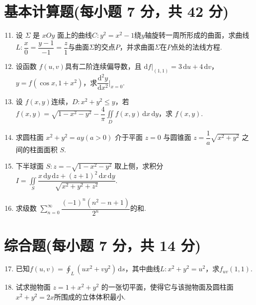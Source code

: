 \documentclass[../Main.tex]{subfiles}
\begin{document}
\section{基本计算题(每小题 7 分，共 42 分)}
\begin{enumerate}
  \setcounter{enumi}{10}
  \item 设 \( \Sigma \) 是 \( xOy \) 面上的曲线$C:y^2=x^2-1$绕$y$轴旋转一周所形成的曲面，求曲线$L:\dfrac{x}{0}=\dfrac{y-1}{-1}=\dfrac{z}{1}$与曲面$\Sigma$的交点$P$，并求曲面$\Sigma$在$P$点处的法线方程.
        \vspace{6em}

  \item 设函数 \( f(u,v) \)具有二阶连续偏导数，且 \( \mathrm{d}f\big|_{(1,1)}=3\,\mathrm{d}u+4\,\mathrm{d}v \)，\( y=f(\cos x,1+x^2) \)，求$\dfrac{\mathrm{d}^2 y}{\mathrm{d}x^2}\bigg|_{x=0}$.
        \vspace{9em}

  \item 设 \( f(x,y) \)连续，\( D:x^2+y^2 \leq y \)，若$f(x,y)=\sqrt{1-x^2-y^2}-\dfrac{4}{\pi}\displaystyle \iint\limits_D f(x,y)\,\mathrm{d}x\,\mathrm{d}y$，求 \( f(x,y) \).
        \vspace{9em}

  \item 求圆柱面 \( x^2+y^2=ay(a>0) \) 介于平面 \( z = 0 \) 与圆锥面 \( z=\dfrac{1}{a}\sqrt{x^2+y^2} \) 之间的柱面面积 \( S \).
        \vspace{9em}

  \item 下半球面 \( S:z=-\sqrt{1-x^2-y^2} \) 取上侧，求积分 \( I = \displaystyle \iint \limits_S \dfrac{x\,\mathrm{d}y\,\mathrm{d}z+(z+1)^2\,\mathrm{d}x\,\mathrm{d}y}{\sqrt{x^2+y^2+z^2}} \).
        \vspace{10em}

  \item 求级数 \( \displaystyle \sum \limits_{n=0}^{\infty}\dfrac{(-1)^n(n^2-n+1)}{2^n} \)的和.
        \vspace{10em}
\end{enumerate}

\section{综合题(每小题 7 分，共 14 分)}
\begin{enumerate}
  \setcounter{enumi}{16}
  \item 已知$f(u,v)=\displaystyle \oint_L (ux^2+vy^2)\,\mathrm{d}s$，其中曲线$L:x^2+y^2=u^2$，求$f_{uv}(1,1)$.
        \vspace{10em}

  \item 试求抛物面 \( z=1+x^2+y^2 \) 的一张切平面，使得它与该抛物面及圆柱面 \( x^2+y^2=2x \)所围成的立体体积最小.
        \vspace{10em}
\end{enumerate}
\end{document}
